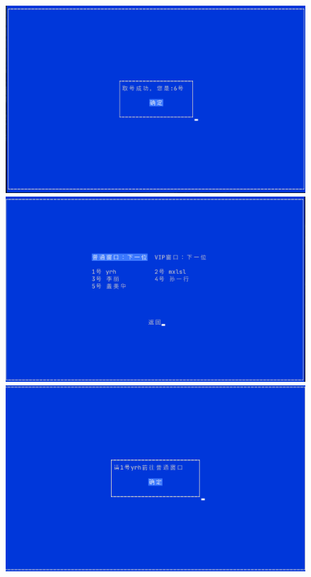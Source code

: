 \documentclass{ctexrep}
\begin{document}
\begin{figure}[H]
  \centering
  \includegraphics[scale=0.38]{preview_queue_0.png}
  \includegraphics[scale=0.38]{preview_queue_1.png}
  \includegraphics[scale=0.38]{preview_queue_2.png}

\end{figure}
\end{document}

